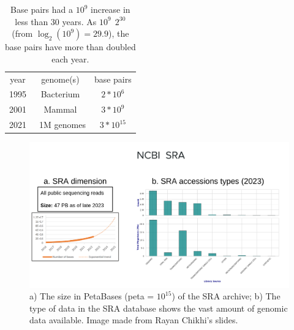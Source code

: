 \begin{table}[h!]
	\centering
	\begin{tabular}{c | c | c}
		year & genome(s) & base pairs \\
		1995 & Bacterium & $ 2*10^6$ \\
		2001 & Mammal & $ 3*10^9$ \\
		2021 & ~1M genomes & $ 3*10^{15}$ \\
	\end{tabular}
	\caption[DNA data increase over the years.]{Base pairs had a $10^9$ increase in less than 30 years. As $10^9 ~~ 2^{30}$ (from $ \log_2(10^9) = 29.9$), the base pairs have more than doubled each year\cite{durbin_recomb}.}
	\label{tab:bp-increase}
\end{table}
\begin{figure}[h!]
	\centering
	\includegraphics[width=\linewidth]{figures/background/sra.png}
	\caption[The Sequence Read Archive.]{a) The size in PetaBases (peta = $10^{15}$) of the SRA archive; b) The type of data in the SRA database shows the vast amount of genomic data available. Image made from Rayan Chikhi's slides.\\}
	\label{fig:SRA}
\end{figure}

